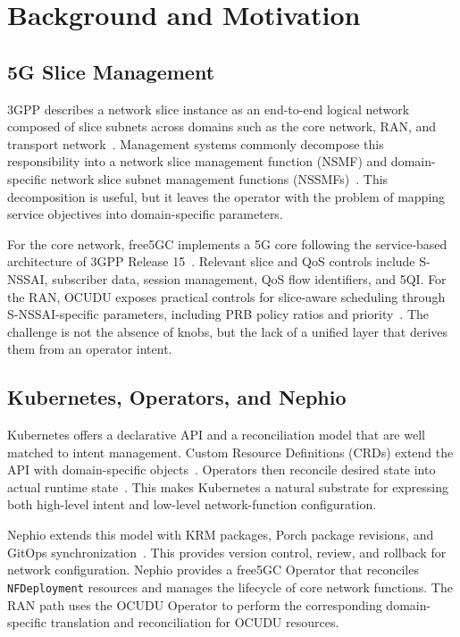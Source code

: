 ﻿\section{Background and Motivation}
\label{sec:background}

\subsection{5G Slice Management}

3GPP describes a network slice instance as an end-to-end logical network composed of slice subnets across domains such as the core network, RAN, and transport network~\cite{3gpp_ts28530}. Management systems commonly decompose this responsibility into a network slice management function (NSMF) and domain-specific network slice subnet management functions (NSSMFs)~\cite{3gpp_ts28533}. This decomposition is useful, but it leaves the operator with the problem of mapping service objectives into domain-specific parameters.

For the core network, free5GC implements a 5G core following the service-based architecture of 3GPP Release 15~\cite{free5gc,3gpp_ts23501}. Relevant slice and QoS controls include S-NSSAI, subscriber data, session management, QoS flow identifiers, and 5QI. For the RAN, OCUDU exposes practical controls for slice-aware scheduling through S-NSSAI-specific parameters, including PRB policy ratios and priority~\cite{ocudu,ocudu_oran_gnb_doc}. The challenge is not the absence of knobs, but the lack of a unified layer that derives them from an operator intent.

\subsection{Kubernetes, Operators, and Nephio}

Kubernetes offers a declarative API and a reconciliation model that are well matched to intent management. Custom Resource Definitions (CRDs) extend the API with domain-specific objects~\cite{kubernetes_custom_resources}. Operators then reconcile desired state into actual runtime state~\cite{kubernetes_operator_pattern,kubernetes_controller}. This makes Kubernetes a natural substrate for expressing both high-level intent and low-level network-function configuration.

Nephio extends this model with KRM packages, Porch package revisions, and GitOps synchronization~\cite{nephio,google_config_sync,cncf_gitops_2025}. This provides version control, review, and rollback for network configuration. Nephio provides a free5GC Operator that reconciles \texttt{NFDeployment} resources and manages the lifecycle of core network functions. The RAN path uses the OCUDU Operator to perform the corresponding domain-specific translation and reconciliation for OCUDU resources.

